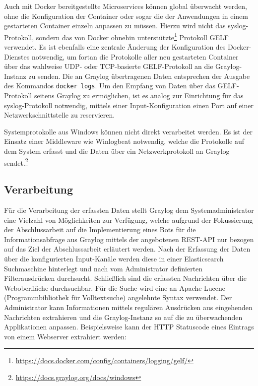 Auch mit Docker bereitgestellte Microservices können global überwacht werden, ohne die Konfiguration der Container oder sogar die der Anwendungen in einem gestarteten Container einzeln anpassen zu müssen. Hierzu wird nicht das syslog-Protokoll, sondern das von Docker ohnehin unterstützte\footnote{\url{https://docs.docker.com/config/containers/logging/gelf/}} Protokoll GELF verwendet. Es ist ebenfalls eine zentrale Änderung der Konfiguration des Docker-Dienstes notwendig, um fortan die Protokolle aller neu gestarteten Container über das wahlweise UDP- oder TCP-basierte GELF-Protokoll an die Graylog-Instanz zu senden. Die an Graylog übertragenen Daten entsprechen der Ausgabe des Kommandos \lstinline{docker logs}. Um den Empfang von Daten über das GELF-Protokoll seitens Graylog zu ermöglichen, ist es analog zur Einrichtung für das syslog-Protokoll notwendig, mittels einer Input-Konfiguration einen Port auf einer Netzwerkschnittstelle zu reservieren.

Systemprotokolle aus Windows können nicht direkt verarbeitet werden. Es ist der Einsatz einer Middleware wie Winlogbeat notwendig, welche die Protokolle auf dem System erfasst und die Daten über ein Netzwerkprotokoll an Graylog sendet.\footnote{\url{https://docs.graylog.org/docs/windows}}

\subsection{Verarbeitung}

Für die Verarbeitung der erfassten Daten stellt Graylog dem Systemadministrator eine Vielzahl von Möglichkeiten zur Verfügung, welche aufgrund der Fokussierung der Abschlussarbeit auf die Implementierung eines Bots für die Informationsabfrage aus Graylog mittels der angebotenen REST-API nur bezogen auf das Ziel der Abschlussarbeit erläutert werden. Nach der Erfassung der Daten über die konfigurierten Input-Kanäle werden diese in einer Elasticsearch Suchmaschine hinterlegt und nach vom Administrator definierten Filterausdrücken durchsucht. Schließlich sind die erfassten Nachrichten über die Weboberfläche durchsuchbar. Für die Suche wird eine an Apache Lucene (Programmbibliothek für Volltextsuche) angelehnte Syntax verwendet. Der Administrator kann Informationen mittels regulären Ausdrücken aus eingehenden Nachrichten extrahieren und die Graylog-Instanz so auf die zu überwachenden Applikationen anpassen. Beispielsweise kann der HTTP Statuscode eines Eintrags von einem Webserver extrahiert werden:

